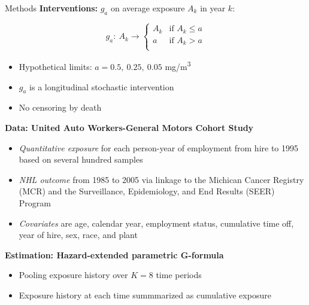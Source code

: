 \documentclass[final]{beamer}
\newlength{\onecolwid}
\begin{document}
\begin{frame}[t]
\begin{columns}[t,onlytextwidth,totalwidth=\onecolwid]
\begin{column}{\onecolwid}
\begin{block}{Methods}
\textbf{Interventions:} $g_a$ on average exposure $A_k$ in year $k$:

$$g_a:\ A_k \longrightarrow
\begin{cases}
A_k & \text{if } A_k \le a \\
a & \text{if } A_k > a \\
\end{cases}$$

\begin{itemize}\setlength{\itemsep}{7pt}
\item Hypothetical limits: $a = 0.5,\ 0.25,\ 0.05$ mg/m\textsuperscript{3}
\item $g_a$ is a longitudinal stochastic intervention
\item No censoring by death
\end{itemize}

\vspace{0.5\baselineskip}\textbf{Data: United Auto Workers-General Motors Cohort Study}

\vspace{0.5\baselineskip}
\begin{minipage}{\linewidth}
\begin{itemize}\setlength{\itemsep}{7pt}
\item \textit{Quantitative exposure} for each person-year of employment from hire to 1995 based on several hundred samples
\item \textit{NHL outcome} from 1985 to 2005 via linkage to the Michican Cancer Registry (MCR) and the Surveillance, Epidemiology, and End Results (SEER) Program
\item \textit{Covariates} are age, calendar year, employment status, cumulative time off, year of hire, sex, race, and plant
\end{itemize}
\end{minipage}\vspace{0.25\baselineskip}



\vspace{0.5\baselineskip}\textbf{Estimation: Hazard-extended parametric G-formula \nocite{Wen_2020}}

\begin{itemize}\setlength{\itemsep}{7pt}
\item Pooling exposure history over $K = 8$ time periods
\item Exposure history at each time summmarized as cumulative exposure
\end{itemize}


\end{block}
\end{column}
\end{columns}
\end{frame}
\end{document}
